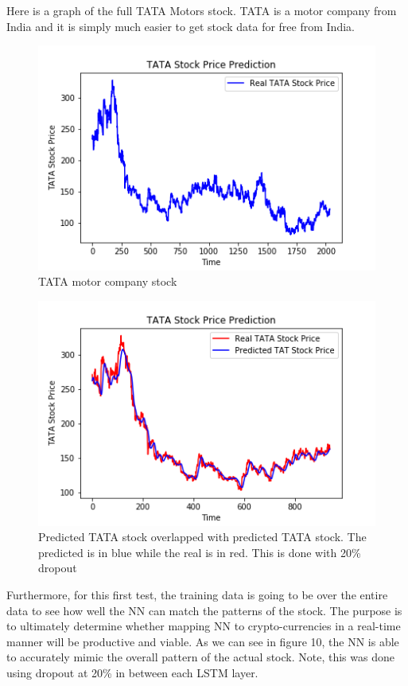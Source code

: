 \documentclass[12pt]{article}
\begin{document}
Here is a graph of the full TATA Motors stock. TATA is a motor company from India and it is simply much easier to get stock data for free from India. 
\begin{figure}[H]
  \includegraphics[width=\linewidth]{images/TI.png}
  \caption{TATA motor company stock}
\end{figure}

\begin{figure}[H]
  \includegraphics[width=\linewidth, scale=.5]{images/T1.png}
  \caption{Predicted TATA stock overlapped with predicted TATA stock. The predicted is in blue while the real is in red. This is done with 20\% dropout}
\end{figure}

Furthermore, for this first test, the training data is going to be over the entire data to see how well the NN can match the patterns of the stock. The purpose is to ultimately determine whether mapping NN to crypto-currencies in a real-time manner will be productive and viable. As we can see in figure 10, the NN is able to accurately mimic the overall pattern of the actual stock. Note, this was done using dropout at 20\% in between each LSTM layer. 
\end{document}
